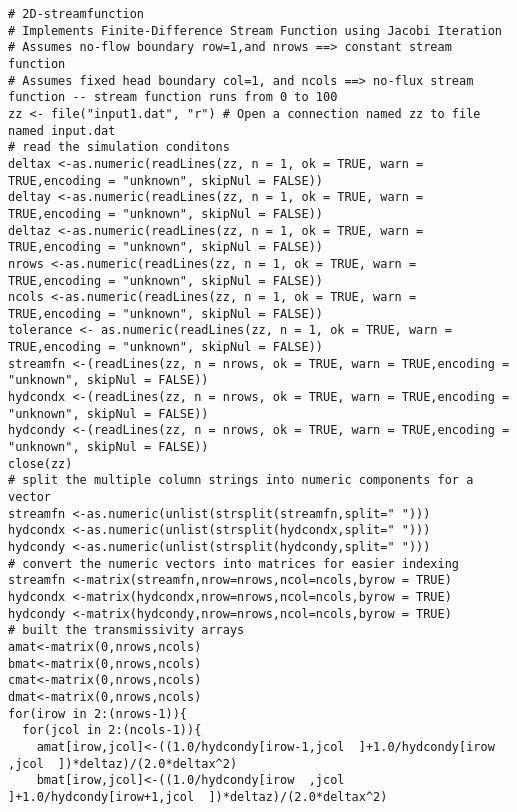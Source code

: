 \begin{lstlisting}[caption= R code demonstrating an Stream Function Simulator for 2D Steady Flow.  This code fragment implements the Jacobi iteration.  A subsequent listing shows the contour plot syntax.  In the example the two fragments are joined and run as a single source file \\ , label=lst:2D-JacobiStream]
# 2D-streamfunction
# Implements Finite-Difference Stream Function using Jacobi Iteration
# Assumes no-flow boundary row=1,and nrows ==> constant stream function
# Assumes fixed head boundary col=1, and ncols ==> no-flux stream function -- stream function runs from 0 to 100
zz <- file("input1.dat", "r") # Open a connection named zz to file named input.dat
# read the simulation conditons
deltax <-as.numeric(readLines(zz, n = 1, ok = TRUE, warn = TRUE,encoding = "unknown", skipNul = FALSE))
deltay <-as.numeric(readLines(zz, n = 1, ok = TRUE, warn = TRUE,encoding = "unknown", skipNul = FALSE))
deltaz <-as.numeric(readLines(zz, n = 1, ok = TRUE, warn = TRUE,encoding = "unknown", skipNul = FALSE))
nrows <-as.numeric(readLines(zz, n = 1, ok = TRUE, warn = TRUE,encoding = "unknown", skipNul = FALSE))
ncols <-as.numeric(readLines(zz, n = 1, ok = TRUE, warn = TRUE,encoding = "unknown", skipNul = FALSE))
tolerance <- as.numeric(readLines(zz, n = 1, ok = TRUE, warn = TRUE,encoding = "unknown", skipNul = FALSE))
streamfn <-(readLines(zz, n = nrows, ok = TRUE, warn = TRUE,encoding = "unknown", skipNul = FALSE))
hydcondx <-(readLines(zz, n = nrows, ok = TRUE, warn = TRUE,encoding = "unknown", skipNul = FALSE))
hydcondy <-(readLines(zz, n = nrows, ok = TRUE, warn = TRUE,encoding = "unknown", skipNul = FALSE))
close(zz)
# split the multiple column strings into numeric components for a vector
streamfn <-as.numeric(unlist(strsplit(streamfn,split=" ")))
hydcondx <-as.numeric(unlist(strsplit(hydcondx,split=" ")))
hydcondy <-as.numeric(unlist(strsplit(hydcondy,split=" ")))
# convert the numeric vectors into matrices for easier indexing
streamfn <-matrix(streamfn,nrow=nrows,ncol=ncols,byrow = TRUE)
hydcondx <-matrix(hydcondx,nrow=nrows,ncol=ncols,byrow = TRUE)
hydcondy <-matrix(hydcondy,nrow=nrows,ncol=ncols,byrow = TRUE)
# built the transmissivity arrays
amat<-matrix(0,nrows,ncols) 
bmat<-matrix(0,nrows,ncols) 
cmat<-matrix(0,nrows,ncols)
dmat<-matrix(0,nrows,ncols)
for(irow in 2:(nrows-1)){
  for(jcol in 2:(ncols-1)){
    amat[irow,jcol]<-((1.0/hydcondy[irow-1,jcol  ]+1.0/hydcondy[irow  ,jcol  ])*deltaz)/(2.0*deltax^2)
    bmat[irow,jcol]<-((1.0/hydcondy[irow  ,jcol  ]+1.0/hydcondy[irow+1,jcol  ])*deltaz)/(2.0*deltax^2)

\end{lstlisting}
